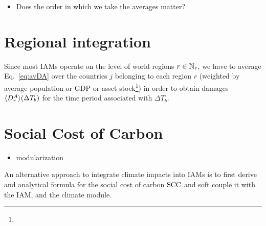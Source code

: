 \documentclass[preprint,3p,authoryear]{elsarticle}
\begin{document}
\begin{itemize}
\item Does the order in which we take the averages matter?
\end{itemize}

\section{Regional integration}
\label{sec:regInt}
Since most IAMs operate on the level of world regions $r\in\mathbb{N}_r$, we have to average Eq.~\eqref{eq:avDA} over the countries $j$ belonging to each region $r$ (weighted by average population or GDP or asset stock\footnote{})  in order to obtain damages $\langle D^A_{r}\rangle(\Delta T_b)$ for the time period associated with $\Delta T_b$.

\section{Social Cost of Carbon}
\label{sec:SCC}

\begin{itemize}
\item modularization
\end{itemize}
An alternative approach to integrate climate impacts into IAMs is to first derive and analytical formula for the social cost of carbon $\operatorname{SCC}$ and soft couple it with the IAM, and the climate module.
\end{document}

